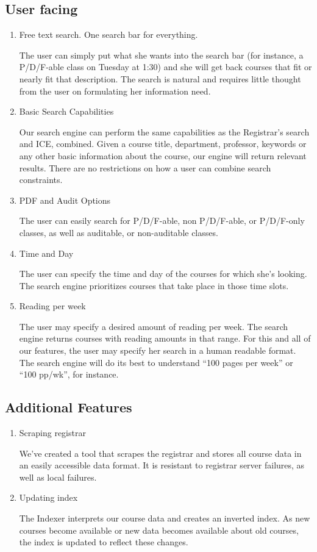 \documentclass[12pt,letterpaper]{article}
\begin{document}
\subsection{User facing}
\begin{enumerate}
\item Free text search. One search bar for everything.
  
  The user can simply put what she wants into the search bar (for instance, a P/D/F-able class on Tuesday at 1:30) and she will get back courses that fit or nearly fit that description. The search is natural and requires little thought from the user on formulating her information need. 
  
\item Basic Search Capabilities
  
  Our search engine can perform the same capabilities as the Registrar's search and ICE, combined. Given a course title, department, professor, keywords or any other basic information about the course, our engine will return relevant results. There are no restrictions on how a user can combine search constraints.
  
\item PDF and Audit Options
  
  The user can easily search for P/D/F-able, non P/D/F-able, or P/D/F-only classes, as well as auditable, or non-auditable classes.
  
\item Time and Day
			  
  The user can specify the time and day of the courses for which she's looking. The search engine prioritizes courses that take place in those time slots.
  
\item Reading per week
  
  The user may specify a desired amount of reading per week. The search engine returns courses with reading amounts in that range. For this and all of our features, the user may specify her search in a human readable format. The search engine will do its best to understand ``100 pages per week'' or ``100 pp/wk'', for instance.
  
\end{enumerate}

\subsection{Additional Features}
\begin{enumerate}
\item Scraping registrar 
  
  We've created a tool that scrapes the registrar and stores all course data in an easily accessible data format. It is resistant to registrar server failures, as well as local failures.
			
\item Updating index 
  
  The Indexer interprets our course data and creates an inverted index. As new courses become available or new data becomes available about old courses, the index is updated to reflect these changes.
  
\end{enumerate}
\end{document}
